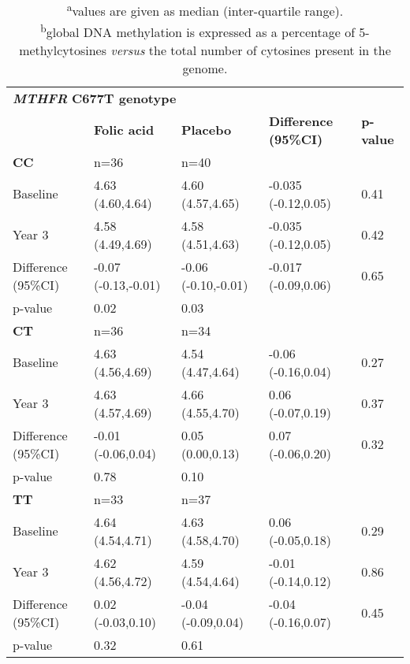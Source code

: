 \begin{table}
\small
\renewcommand*{\arraystretch}{1.1}
\caption*{\textbf{Table 4.3} Folic acid supplementation on global DNA methylation for the whole study population, for those with less than normal RBC folate status at baseline, low and high baseline methylation, and stratified by \emph{MTHFR} C677T genotype. \emph{(continued)}}
\label{table4_3}
\begin{tabular}{L{2.6cm}C{2.5cm}C{2.4cm}C{2.7cm}C{1cm}}
\\
~ & \bfseries Folic acid & \bfseries Placebo & \bfseries Difference (95\%CI) & \bfseries p-value\\
\bfseries CC & n=36 & n=40 & ~ & ~ \\
 Baseline & 4.63 (4.60,4.64) & 4.60 (4.57,4.65) & {}-0.035 (-0.12,0.05) & 0.41\\
 Year 3 & 4.58 (4.49,4.69) & 4.58 (4.51,4.63) & {}-0.035 (-0.12,0.05) & 0.42\\
 Difference (95\%CI) & {}-0.07 (-0.13,-0.01) & {}-0.06 (-0.10,-0.01) & {}-0.017 (-0.09,0.06) & 0.65\\
 p-value & 0.02 & 0.03 & ~ & ~ \\
\bfseries CT & n=36 & n=34 & ~ & ~ \\
 Baseline & 4.63 (4.56,4.69) & 4.54 (4.47,4.64) & {}-0.06 (-0.16,0.04) & 0.27\\
 Year 3 & 4.63 (4.57,4.69) & 4.66 (4.55,4.70) & 0.06 (-0.07,0.19) & 0.37\\
 Difference (95\%CI) & {}-0.01 (-0.06,0.04) & 0.05 (0.00,0.13) & 0.07 (-0.06,0.20) & 0.32\\
 p-value & 0.78 & 0.10 & ~ & ~ \\
\bfseries TT & n=33 & n=37 & ~ & ~ \\
 Baseline & 4.64 (4.54,4.71) & 4.63 (4.58,4.70) & 0.06 (-0.05,0.18) & 0.29\\
 Year 3 & 4.62 (4.56,4.72) & 4.59 (4.54,4.64) & {}-0.01 (-0.14,0.12) & 0.86\\
 Difference (95\%CI) & 0.02 (-0.03,0.10) & {}-0.04 (-0.09,0.04) & {}-0.04 (-0.16,0.07) & 0.45\\
 p-value & 0.32 & 0.61 & ~ & ~ \\
\hline
\end{tabular}
\caption*{\footnotesize{\textsuperscript{a}values are given as median (inter-quartile range).\\\textsuperscript{b}global DNA methylation is expressed as a percentage of 5-methylcytosines \emph{versus} the total number of cytosines present in the genome.}}
\end{table}


